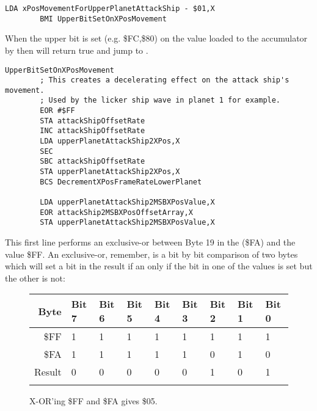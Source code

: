 \begin{lstlisting}[caption=From \icode{UpdateAttackShipsXAndYPositions}.  ]
        LDA xPosMovementForUpperPlanetAttackShip - $01,X
        BMI UpperBitSetOnXPosMovement
\end{lstlisting}

When the upper bit is set (e.g. \$FC,\$80) on the value loaded to the accumulator by  then  will 
return true and jump to .

\begin{lstlisting}
UpperBitSetOnXPosMovement   
        ; This creates a decelerating effect on the attack ship's movement.
        ; Used by the licker ship wave in planet 1 for example.
        EOR #$FF
        STA attackShipOffsetRate
        INC attackShipOffsetRate
        LDA upperPlanetAttackShip2XPos,X
        SEC
        SBC attackShipOffsetRate
        STA upperPlanetAttackShip2XPos,X
        BCS DecrementXPosFrameRateLowerPlanet

        LDA upperPlanetAttackShip2MSBXPosValue,X
        EOR attackShip2MSBXPosOffsetArray,X
        STA upperPlanetAttackShip2MSBXPosValue,X
\end{lstlisting}

This first line  performs an exclusive-or between Byte 19 in the  (\$FA) and the value \$FF. An exclusive-or,
remember, is a bit by bit comparison of two bytes which will set a bit in the result if an only if the bit in one of the
values is set but the other is not:

\begin{figure}[H]
  {
    \setlength{\tabcolsep}{3.0pt}
    \setlength\cmidrulewidth{\heavyrulewidth} %
    \begin{adjustbox}{width=10cm,center}

      \begin{tabular}{rllllllll}
        \toprule
        Byte & Bit 7 & Bit 6 & Bit 5 & Bit 4 & Bit 3 & Bit 2 & Bit 1 & Bit 0        \\
        \midrule
        \$FF & 1 & 1 & 1 & 1 & 1 & 1 & 1 & 1 \\
        \$FA & 1 & 1 & 1 & 1 & 1 & 0 & 1 & 0 \\
        \midrule
        Result & 0 & 0 & 0 & 0 & 0 & 1 & 0 & 1 \\
        \addlinespace
        \bottomrule
      \end{tabular}

    \end{adjustbox}

    }\caption*{X-OR'ing \$FF and \$FA gives \$05.}
\end{figure}

